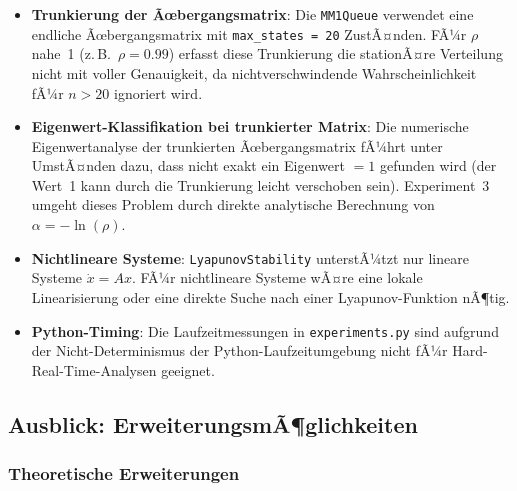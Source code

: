 ﻿\documentclass[a4paper,12pt]{scrreprt}
\theoremstyle{definition}
\begin{document}
\begin{itemize}
	\item \textbf{Trunkierung der Ãœbergangsmatrix}: Die
	\texttt{MM1Queue} verwendet eine endliche Ãœbergangsmatrix
	mit \texttt{max\_states = 20} ZustÃ¤nden.  FÃ¼r $\rho$ nahe~1
	(z.\,B.~$\rho = 0.99$) erfasst diese Trunkierung die
	stationÃ¤re Verteilung nicht mit voller Genauigkeit, da
	nichtverschwindende Wahrscheinlichkeit fÃ¼r $n > 20$ ignoriert
	wird.
	
	\item \textbf{Eigenwert-Klassifikation bei trunkierter Matrix}:
	Die numerische Eigenwertanalyse der trunkierten
	Ãœbergangsmatrix fÃ¼hrt unter UmstÃ¤nden dazu, dass nicht
	exakt ein Eigenwert $= 1$ gefunden wird (der Wert~1 kann
	durch die Trunkierung leicht verschoben sein).  Experiment~3
	umgeht dieses Problem durch direkte analytische Berechnung
	von $\alpha = -\ln(\rho)$.
	
	\item \textbf{Nichtlineare Systeme}: \texttt{LyapunovStability}
	unterstÃ¼tzt nur lineare Systeme $\dot{x} = Ax$.  FÃ¼r
	nichtlineare Systeme wÃ¤re eine lokale Linearisierung oder
	eine direkte Suche nach einer Lyapunov-Funktion nÃ¶tig.
	
	\item \textbf{Python-Timing}: Die Laufzeitmessungen in
	\texttt{experiments.py} sind aufgrund der
	Nicht-Determinismus der Python-Laufzeitumgebung nicht fÃ¼r
	Hard-Real-Time-Analysen geeignet.
\end{itemize}

\subsection{Ausblick: ErweiterungsmÃ¶glichkeiten}
\label{subsec:ausblick}

\subsubsection{Theoretische Erweiterungen}
\end{document}

